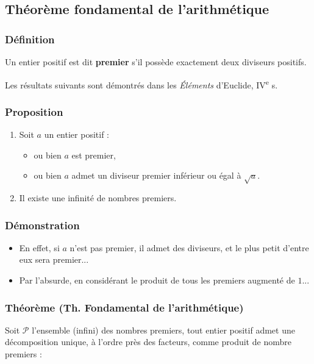 \subsection{Théorème fondamental de l'arithmétique}

\subsubsection{Définition}
    Un entier positif est dit \textbf{premier} s'il possède exactement deux
    diviseurs positifs.
        
    Les résultats suivants sont démontrés dans les \emph{Éléments} d'Euclide,
    IV\textsuperscript{e} s.
    
\subsubsection{Proposition}
    \begin{enumerate}
        \item Soit $a$ un entier positif :
             \begin{itemize}
                 \item ou bien $a$ est premier,
                 \item ou bien $a$ admet un diviseur premier inférieur ou égal à
                    $\sqrt{a}$.
             \end{itemize}
         \item Il existe une infinité de nombres premiers.
    \end{enumerate}
    
\subsubsection{Démonstration}
    \begin{itemize}
        \item En effet, si $a$ n'est pas premier, il admet des diviseurs,
            et le plus petit d'entre eux sera premier...
        \item Par l'absurde, en considérant le produit de tous les premiers
            augmenté de $1$...
    \end{itemize}
    
\subsubsection{Théorème (Th. Fondamental de l'arithmétique)}
    Soit $\mathcal{P}$ l'ensemble (infini) des nombres premiers,
    tout entier positif admet une décomposition unique, à l'ordre près
    des facteurs, comme produit de nombre premiers :
    
